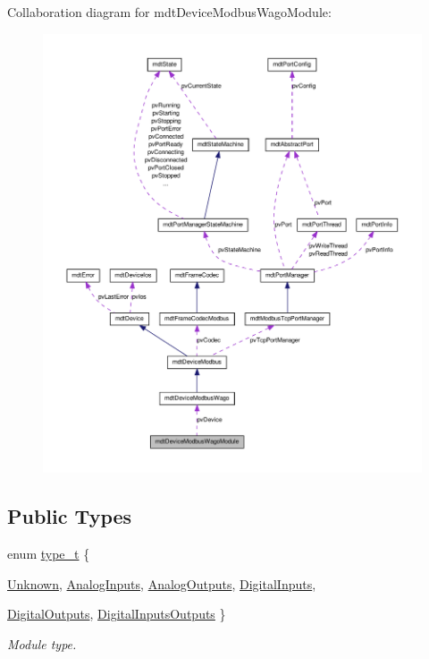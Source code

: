 Collaboration diagram for mdtDeviceModbusWagoModule:
\nopagebreak
\begin{figure}[H]
\begin{center}
\leavevmode
\includegraphics[width=400pt]{classmdt_device_modbus_wago_module__coll__graph}
\end{center}
\end{figure}
\subsection*{Public Types}
\begin{DoxyCompactItemize}
\item 
enum \hyperlink{classmdt_device_modbus_wago_module_a2d8f6895b2a031c953bd91c2f65a1a25}{type\_\-t} \{ \par
\hyperlink{classmdt_device_modbus_wago_module_a2d8f6895b2a031c953bd91c2f65a1a25aa195556cb75e827f16f81e9f09908660}{Unknown}, 
\hyperlink{classmdt_device_modbus_wago_module_a2d8f6895b2a031c953bd91c2f65a1a25a70609836e6ef603f912da6084adf3c9d}{AnalogInputs}, 
\hyperlink{classmdt_device_modbus_wago_module_a2d8f6895b2a031c953bd91c2f65a1a25a38c67b211155faa87f52767c60134f33}{AnalogOutputs}, 
\hyperlink{classmdt_device_modbus_wago_module_a2d8f6895b2a031c953bd91c2f65a1a25aee246eb286603d48008177621980eda4}{DigitalInputs}, 
\par
\hyperlink{classmdt_device_modbus_wago_module_a2d8f6895b2a031c953bd91c2f65a1a25ace992008f0003a8ee2106872b6a410a3}{DigitalOutputs}, 
\hyperlink{classmdt_device_modbus_wago_module_a2d8f6895b2a031c953bd91c2f65a1a25adbe63d8313a77922b9a7808a5321fdb7}{DigitalInputsOutputs}
 \}
\begin{DoxyCompactList}\small\item\em Module type. \end{DoxyCompactList}\end{DoxyCompactItemize}
